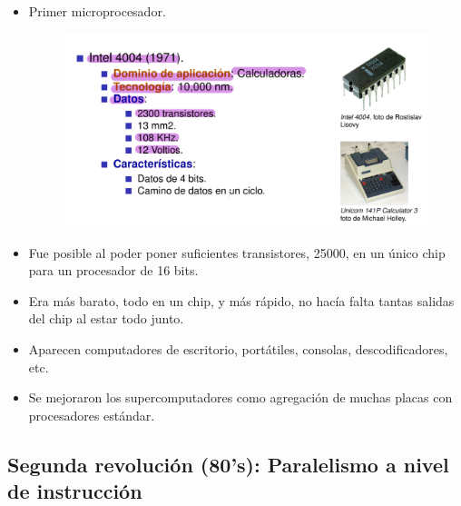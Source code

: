 \documentclass[12pt, twoside, openright]{report} %
\begin{document}
    \begin{itemize}
    \item
      Primer microprocesador.
      \begin{figure}[H]
        {\includegraphics[scale=.25]{Untitled 2.png}}
      \end{figure}
    \item
      Fue posible al poder poner suficientes transistores, 25000, en un
      único chip para un procesador de 16 bits.
    \item
      Era más barato, todo en un chip, y más rápido, no hacía falta
      tantas salidas del chip al estar todo junto.
    \item
      Aparecen computadores de escritorio, portátiles, consolas,
      descodificadores, etc.
    \item
      Se mejoraron los supercomputadores como agregación de muchas
      placas con procesadores estándar.
    \end{itemize}
  
    \subsection{Segunda revolución (80's): Paralelismo a nivel de instrucción}
\end{document}
